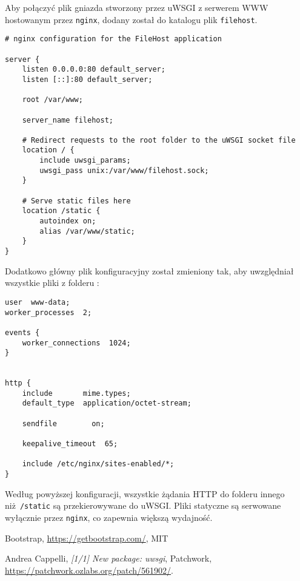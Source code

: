 \documentclass[10pt,a4paper]{article}
\begin{document}
Aby połączyć plik gniazda stworzony przez uWSGI z serwerem WWW hostowanym przez \texttt{nginx},
dodany został do katalogu  plik \texttt{filehost}.
\begin{lstlisting}[caption=Zawartość pliku \directory{/etc/nginx/sites-enabled/filehost}]
# nginx configuration for the FileHost application

server {
	listen 0.0.0.0:80 default_server;
	listen [::]:80 default_server;

	root /var/www;

	server_name filehost;

	# Redirect requests to the root folder to the uWSGI socket file
	location / {
		include uwsgi_params;
		uwsgi_pass unix:/var/www/filehost.sock;
	}

	# Serve static files here
	location /static {
		autoindex on;
		alias /var/www/static;
	}
}
\end{lstlisting}
Dodatkowo główny plik konfiguracyjny  został zmieniony tak,
aby uwzględniał wszystkie pliki z folderu :
\begin{lstlisting}[caption=Zawartość pliku \directory{/etc/nginx/nginx.conf}]
user  www-data;
worker_processes  2;

events {
    worker_connections  1024;
}


http {
    include       mime.types;
    default_type  application/octet-stream;

    sendfile        on;

    keepalive_timeout  65;

    include /etc/nginx/sites-enabled/*;
}
\end{lstlisting}
Według powyższej konfiguracji, wszystkie żądania HTTP do folderu innego niż \texttt{/static}
są przekierowywane do uWSGI. Pliki statyczne są serwowane wyłącznie przez \texttt{nginx},
co zapewnia większą wydajność.

\begin{thebibliography}{9}
		Bootstrap,
		\url{https://getbootstrap.com/},
		MIT

		Andrea Cappelli,
		\emph{[1/1] New package: uwsgi},
		Patchwork,
		\url{https://patchwork.ozlabs.org/patch/561902/}.
\end{thebibliography}
\end{document}
